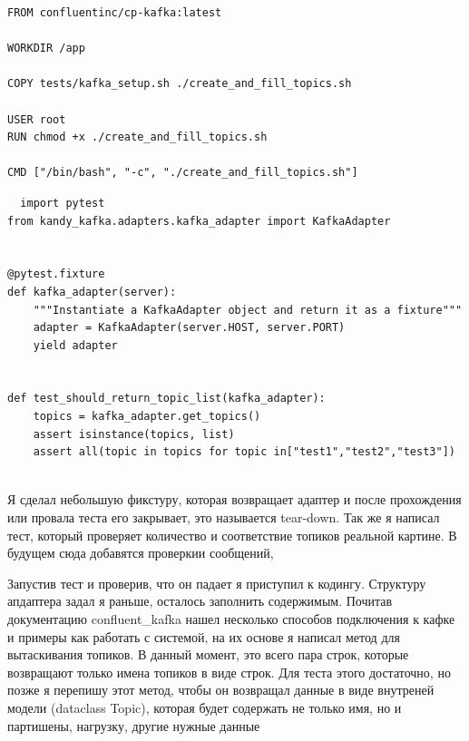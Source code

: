 \documentclass[10pt , a4paper]{report}
\newenvironment{code}{\captionsetup{type=listing}}{}
\begin{document}
\begin{code}
  \begin{verbatim}
FROM confluentinc/cp-kafka:latest

WORKDIR /app

COPY tests/kafka_setup.sh ./create_and_fill_topics.sh

USER root
RUN chmod +x ./create_and_fill_topics.sh

CMD ["/bin/bash", "-c", "./create_and_fill_topics.sh"]

  \end{verbatim}
\end{code}

\begin{code}
  \begin{verbatim}
  import pytest
from kandy_kafka.adapters.kafka_adapter import KafkaAdapter


@pytest.fixture
def kafka_adapter(server):
    """Instantiate a KafkaAdapter object and return it as a fixture"""
    adapter = KafkaAdapter(server.HOST, server.PORT)
    yield adapter


def test_should_return_topic_list(kafka_adapter):
    topics = kafka_adapter.get_topics()
    assert isinstance(topics, list)
    assert all(topic in topics for topic in["test1","test2","test3"])


  \end{verbatim}
\end{code}

Я сделал небольшую фикстуру, которая возвращает адаптер и после прохождения или провала теста его закрывает, это называется tear-down. Так же я написал тест, который проверяет количество и соответствие топиков реальной картине. В будущем сюда добавятся проверкии сообщений,

Запустив тест и проверив, что он падает я приступил к кодингу. Структуру апдаптера задал я раньше, осталось заполнить содержимым. Почитав документацию confluent\_kafka нашел несколько способов подключения к кафке и примеры как работать с системой, на их основе я написал метод для вытаскивания топиков. В данный момент, это всего пара строк, которые возвращают только имена топиков в виде строк. Для теста этого достаточно, но позже я перепишу этот метод, чтобы он возвращал данные в виде внутреней модели (dataclass Topic), которая будет содержать не только имя, но и партишены, нагрузку, другие нужные данные 
\end{document}
